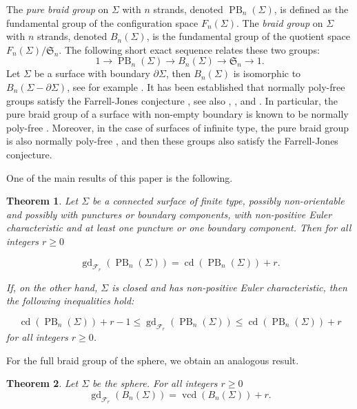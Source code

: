 \documentclass[a4paper,12pt,leqno]{amsart}
\newtheorem{theorem}{Theorem}[section]
\theoremstyle{definition}
\newcommand{\calF}{{\mathcal F}}
\DeclareMathOperator{\cd}{cd}
\DeclareMathOperator{\vcd}{vcd}
\DeclareMathOperator{\gd}{gd}
\DeclareMathOperator{\pb}{PB}
\begin{document}
The \emph{pure braid group} on \( \Sigma \) with \( n \) strands, denoted \( \pb_n(\Sigma) \), is defined as the fundamental group of the configuration space \( F_n(\Sigma) \). The \emph{braid group} on \( \Sigma \) with \( n \) strands, denoted \( B_n(\Sigma) \), is the fundamental group of the quotient space \( F_n(\Sigma) / \mathfrak{S}_n \). The following short exact sequence relates these two groups:
\[
1 \to \pb_n(\Sigma) \to B_n(\Sigma) \to \mathfrak{S}_n \to 1.
\]
Let $\Sigma$ be a surface with boundary $\partial\Sigma$, then $B_n(\Sigma)$ is isomorphic to $B_n(\Sigma-\partial\Sigma)$, see for example \cite[Remarks 8]{MR3382024}.
It has been established that normally poly-free groups satisfy the Farrell-Jones conjecture \cite[Theorem A]{MR4246787}, see also \cite{MR1797585}, \cite[Theorem 1.1]{MR4565703}, and \cite[Theorem 2.3.7]{JPSS}. In particular, the pure braid group of a surface with non-empty boundary is known to be normally poly-free \cite{MR1797585}. Moreover, in the case of surfaces of infinite type, the pure braid group is also normally poly-free \cite[Theorem~1.5(b)]{2025arXiv250610706L}, and then these groups also satisfy the Farrell-Jones conjecture. 


One of the main results of this paper is the following.



\begin{theorem}\label{gd:f1:surface:braid}
Let \( \Sigma \) be a connected surface of finite type, possibly non-orientable and possibly with punctures or boundary components, with non-positive Euler characteristic and at least one puncture or one boundary component. Then for all integers $r\ge0$ 

\[
\gd_{\calF_r}(\pb_n(\Sigma)) =\cd(\pb_n(\Sigma)) + r.
\]


If, on the other hand, \( \Sigma \) is closed and has non-positive Euler characteristic, then the following inequalities hold:

\[
\cd(\pb_n(\Sigma)) + r - 1 \leq \gd_{\calF_r}(\pb_n(\Sigma)) \leq\cd(\pb_n(\Sigma)) + r
\]
for all integers $r\ge0$.
\end{theorem}

For the full braid group of the sphere, we obtain an analogous result.

\begin{theorem}\label{abelian:dim:sphere:0}
Let $\Sigma$ be the sphere. For all integers $r\geq 0$
\[
  \gd_{\calF_r}(B_n(\Sigma)) = \vcd(B_n(\Sigma)) + r.
\]
\end{theorem}
\end{document}
